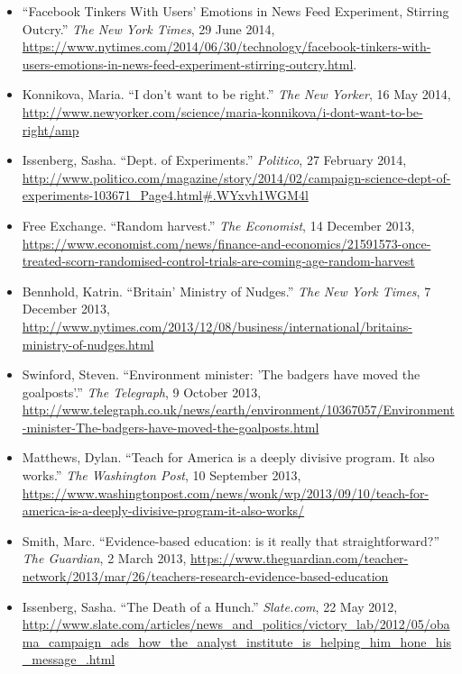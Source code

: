 \documentclass[12pt,a4paper]{article}
\begin{document}
\begin{itemize}
\item ``Facebook Tinkers With Users' Emotions in News Feed Experiment, Stirring Outcry.'' \textit{The New York Times}, 29 June 2014, \url{https://www.nytimes.com/2014/06/30/technology/facebook-tinkers-with-users-emotions-in-news-feed-experiment-stirring-outcry.html}.

\item Konnikova, Maria. ``I don't want to be right.'' \textit{The New Yorker}, 16 May 2014, \url{http://www.newyorker.com/science/maria-konnikova/i-dont-want-to-be-right/amp}
\item Issenberg, Sasha. ``Dept. of Experiments.'' \textit{Politico}, 27 February 2014, \url{http://www.politico.com/magazine/story/2014/02/campaign-science-dept-of-experiments-103671_Page4.html#.WYxvh1WGM4l}

\item Free Exchange. ``Random harvest.'' \textit{The Economist}, 14 December 2013, \url{https://www.economist.com/news/finance-and-economics/21591573-once-treated-scorn-randomised-control-trials-are-coming-age-random-harvest}

\item Bennhold, Katrin. ``Britain' Ministry of Nudges.'' \textit{The New York Times}, 7 December 2013, \url{http://www.nytimes.com/2013/12/08/business/international/britains-ministry-of-nudges.html}

\item Swinford, Steven. ``Environment minister: 'The badgers have moved the goalposts'.'' \textit{The Telegraph}, 9 October 2013, \url{http://www.telegraph.co.uk/news/earth/environment/10367057/Environment-minister-The-badgers-have-moved-the-goalposts.html}

\item Matthews, Dylan. ``Teach for America is a deeply divisive program. It also works.'' \textit{The Washington Post}, 10 September 2013, \url{https://www.washingtonpost.com/news/wonk/wp/2013/09/10/teach-for-america-is-a-deeply-divisive-program-it-also-works/}

\item Smith, Marc. ``Evidence-based education: is it really that straightforward?'' \textit{The Guardian}, 2 March 2013, \url{https://www.theguardian.com/teacher-network/2013/mar/26/teachers-research-evidence-based-education}

\item Issenberg, Sasha. ``The Death of a Hunch.'' \textit{Slate.com}, 22 May 2012,  \url{http://www.slate.com/articles/news_and_politics/victory_lab/2012/05/obama_campaign_ads_how_the_analyst_institute_is_helping_him_hone_his_message_.html}


\end{itemize}
\end{document}
